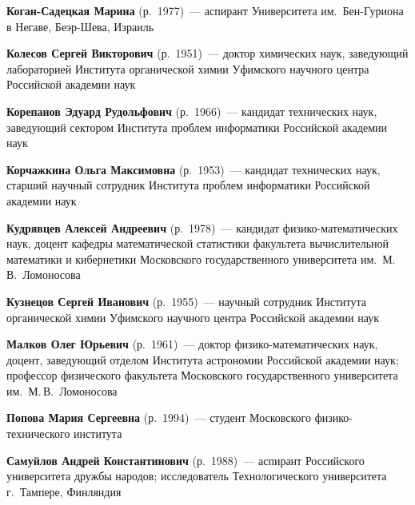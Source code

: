 \begin{multicols}{2}
\vspace*{1pt}

\noindent
\textbf{Коган-Садецкая Марина} (р.\ 1977)~--- аспирант
Университета им.\ Бен-Гуриона в Негаве, Беэр-Шева, Израиль

\vspace*{1pt}
\noindent
\textbf{Колесов Сергей Викторович} (р.\ 1951)~--- доктор химических наук,
заведующий лабораторией Института органической химии
Уфимского научного центра Российской академии наук

\vspace*{1pt}


\noindent
\textbf{Корепанов Эдуард Рудольфович} (р.\ 1966)~---
кандидат технических наук, заведующий сектором Института
проблем информатики Российской академии наук

\vspace*{1pt}

\noindent
\textbf{Корчажкина Ольга Максимовна} (р.\ 1953)~--- кандидат
технических наук, старший научный сотрудник Института проблем
информатики Российской академии наук

\columnbreak

\noindent
\textbf{Кудрявцев Алексей Андреевич} (р.\ 1978)~---
кандидат фи\-зи\-ко-ма\-те\-ма\-ти\-че\-ских наук, доцент кафедры математической
статистики факультета вычислительной математики и кибернетики
Московского государственного университета им.\ М.\,В.~Ломоносова

\vspace*{1pt}

\noindent
\textbf{Кузнецов Сергей Иванович} (р.\ 1955)~---
научный сотрудник Института органической химии Уфимского научного центра
Российской академии наук

\vspace*{1pt}


\noindent
\textbf{Малков Олег Юрьевич} (р.\ 1961)~---
доктор фи\-зи\-ко-ма\-те\-ма\-ти\-че\-ских наук, доцент, заведующий отделом
Института астрономии Российской академии наук; профессор физического
факультета Московского государственного университета им.\ М.\,В.~Ломоносова

\vspace*{1pt}

\noindent
\textbf{Попова Мария Сергеевна} (р.\ 1994)~---
 студент Московского фи\-зи\-ко-тех\-ни\-че\-ско\-го института

 \vspace*{1pt}

\noindent
\textbf{Самуйлов Андрей Константинович} (р.\ 1988)~--- аспирант Российского
университета дружбы народов; исследователь Технологического университета
г.~Тампере, Финляндия


\end{multicols}
